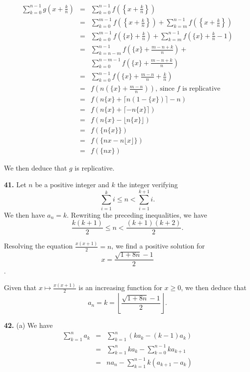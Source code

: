 \documentclass[a4paper,12pt]{article}
\newcommand{\newpar}[1]{\bigskip \noindent \textbf{#1.}}
\newcommand{\subpar}[1]{\medskip \noindent (#1)}
\begin{document}
\begin{eqnarray*}
  \sum_{k=0}^{n-1}g\left(x+\frac{k}{n}\right) &=&
  \sum_{k=0}^{n-1}f\left(\left\{x+\frac{k}{n}\right\}\right) \\
  &=&   \sum_{k=0}^{m-1}f\left(\left\{x+\frac{k}{n}\right\}\right) +
  \sum_{k=m}^{n-1}f\left(\left\{x+\frac{k}{n}\right\}\right) \\
  &=& \sum_{k=0}^{m-1}f\left(\{x\} + \frac{k}{n}\right) +
  \sum_{k=m}^{n-1}f\left(\{x\}+\frac{k}{n}-1\right) \\
  &=& \sum_{k=n-m}^{n-1}f\left(\{x\}+\frac{m-n+k}{n}\right) +\\
  &&\sum_{k=0}^{n-m-1}f\left(\{x\} + \frac{m-n+k}{n}\right) \\
  &=& \sum_{k=0}^{n-1}f\left(\{x\}+\frac{m-n}{n} + \frac{k}{n}\right)
  \\
  &=& f\left(n\left(\{x\} + \frac{m -
    n}{n}\right)\right),\ \mbox{since $f$ is replicative} \\
  &=& f(n\{x\} + \lceil n(1-\{x\})\rceil - n ) \\
  &=& f(n\{x\} + \lceil - n\{x\}\rceil) \\
  &=& f(n\{x\} - \lfloor n\{x\}\rfloor) \\
  &=& f(\{n\{x\}\}) \\
  &=& f(\{nx - n\lfloor x\rfloor\}) \\
  &=& f(\{nx\})
\end{eqnarray*}

We then deduce that $g$ is replicative.

\newpar{41} Let $n$ be a positive integer and $k$ the integer
verifying
\[ \sum_{i=1}^k i \le n < \sum_{i=1}^{k+1}i.\]
We then have $a_n = k$.  Rewriting the preceding inequalities, we have
\[ \frac{k(k+1)}{2} \le n < \frac{(k+1)(k+2)}{2}.\]

Resolving the equation $ \frac{x(x+1)}{2} = n $, we find a positive
solution for \[x = \frac{\sqrt{1+8n}-1}{2}\].

Given that $x \mapsto \frac{x(x+1)}{2}$ is an increasing function for
$x\ge 0$, we then deduce that
\[ a_n = k = \left\lfloor \frac{\sqrt{1+8n}-1}{2}\right\rfloor.\]

\newpar{42} \subpar{a} We have
\begin{eqnarray*}
  \sum_{k=1}^n a_k &=& \sum_{k=1}^n (ka_k - (k-1)a_k) \\
  &=& \sum_{k=1}^n ka_k - \sum_{k=0}^{n-1}ka_{k+1} \\
  &=& na_n - \sum_{k=1}^{n-1} k(a_{k+1} - a_k)
\end{eqnarray*}
\end{document}

